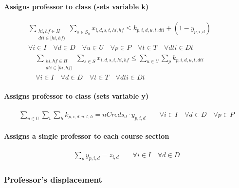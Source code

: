 \paragraph{Assigns professor to class (sets variable k)}
\begin{eqnarray}
\sum_{ \substack {hi,hf \in H \\ dti \in [hi,hf)} } \sum\limits_{s\in S_{u}} x_{i,d,s,t,hi,hf} \le k_{p,i,d,u,t,dti} + ( 1 - y_{p,i,d} ) \nonumber \qquad
\\
\forall i \in I \quad
\forall d \in D \quad
\forall u \in U \quad
\forall p \in P \quad
\forall t \in T \quad
\forall dti \in Dt \nonumber
\end{eqnarray}
\begin{eqnarray}
\sum_{ \substack {hi,hf \in H \\ dti \in [hi,hf)} } \sum\limits_{s\in S} x_{i,d,s,t,hi,hf} \le \sum\limits_{u\in U} \sum\limits_{p} k_{p,i,d,u,t,dti} \nonumber \qquad
\\
\forall i \in I \quad
\forall d \in D \quad
\forall t \in T \quad
\forall dti \in Dt \nonumber
\end{eqnarray}
	
\paragraph{Assigns professor to class (sets variable y)}
\begin{eqnarray}
\sum\limits_{u \in U} \sum\limits_{t} \sum\limits_{h} k_{p,i,d,u,t,h} = nCreds_{d} \cdot y_{p,i,d} \nonumber \qquad
\forall i \in I \quad
\forall d \in D \quad
\forall p \in P
\end{eqnarray}	
	
\paragraph{Assigns a single professor to each course section}
\begin{eqnarray}
\sum\limits_{p} y_{p,i,d} = z_{i,d} \nonumber \qquad
\forall i \in I \quad
\forall d \in D
\end{eqnarray}	


\subsubsection{Professor's displacement}
\label{constrProfessorDisplac}


